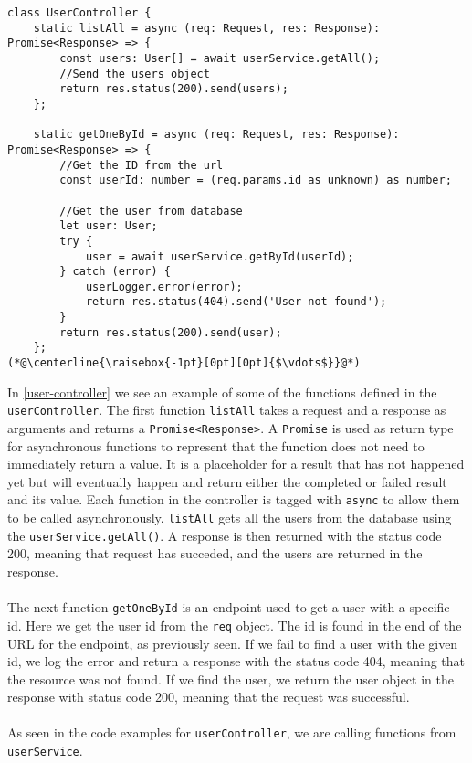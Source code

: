 \begin{lstlisting}[caption={Shows some of the endpoints from the UserController}, captionpos=b, label={user-controller}]
class UserController {
	static listAll = async (req: Request, res: Response): Promise<Response> => {
		const users: User[] = await userService.getAll();
		//Send the users object
		return res.status(200).send(users);
    };

    static getOneById = async (req: Request, res: Response): Promise<Response> => {
		//Get the ID from the url
		const userId: number = (req.params.id as unknown) as number;

		//Get the user from database
		let user: User;
		try {
			user = await userService.getById(userId);
		} catch (error) {
			userLogger.error(error);
			return res.status(404).send('User not found');
		}
		return res.status(200).send(user);
	};
(*@\centerline{\raisebox{-1pt}[0pt][0pt]{$\vdots$}}@*)
\end{lstlisting}
In \autoref{user-controller} we see an example of some of the functions defined in the \texttt{userController}.
The first function \texttt{listAll} takes a request and a response as arguments and returns a \texttt{Promise<Response>}.
A \texttt{Promise} is used as return type for asynchronous functions to represent that the function does not need to immediately return a value.
It is a placeholder for a result that has not happened yet but will eventually happen and return either the completed or failed result and its value.
Each function in the controller is tagged with \texttt{async} to allow them to be called asynchronously. 
\texttt{listAll} gets all the users from the database using the \texttt{userService.getAll()}.
A response is then returned with the status code 200, meaning that request has succeded, and the users are returned in the response. 
\\\\
The next function \texttt{getOneById} is an endpoint used to get a user with a specific id. 
Here we get the user id from the \texttt{req} object. 
The id is found in the end of the URL for the endpoint, as previously seen.
If we fail to find a user with the given id, we log the error and return a response with the status code 404, meaning that the resource was not found.
If we find the user, we return the user object in the response with status code 200, meaning that the request was successful.
\\\\
As seen in the code examples for \texttt{userController}, we are calling functions from \texttt{userService}. 
